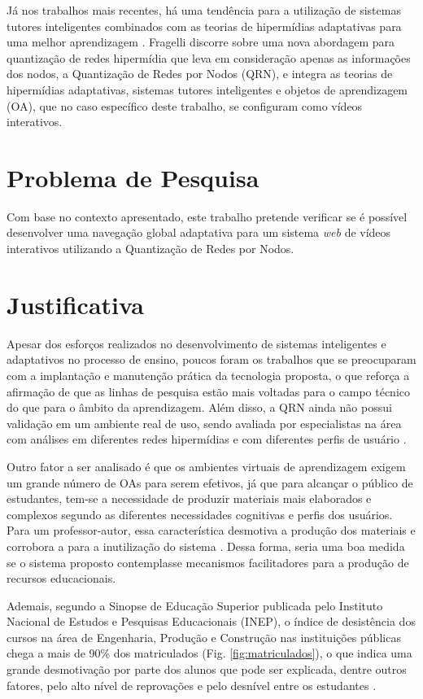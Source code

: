 Já nos trabalhos mais recentes, há uma tendência para a utilização de sistemas tutores inteligentes combinados com as teorias de hipermídias adaptativas para uma melhor aprendizagem \cite{fragelli2010}. Fragelli discorre sobre uma nova abordagem para quantização de redes hipermídia que leva em consideração apenas as informações dos nodos, a Quantização de Redes por Nodos (QRN), e integra as teorias de hipermídias adaptativas, sistemas tutores inteligentes e objetos de aprendizagem (OA), que no caso específico deste trabalho, se configuram como vídeos interativos.

\section*{Problema de Pesquisa}

Com base no contexto apresentado, este trabalho pretende verificar se é possível desenvolver uma navegação global adaptativa para um sistema \textit{web} de vídeos interativos utilizando a Quantização de Redes por Nodos.

\section*{Justificativa}

Apesar dos esforços realizados no desenvolvimento de sistemas inteligentes e adaptativos no processo de ensino, poucos foram os trabalhos que se preocuparam com a implantação e manutenção prática da tecnologia proposta, o que reforça a afirmação de que as linhas de pesquisa estão mais voltadas para o campo técnico do que para o âmbito da aprendizagem. Além disso, a QRN ainda não possui validação em um ambiente real de uso, sendo avaliada por especialistas na área com análises em diferentes redes hipermídias e com diferentes perfis de usuário \cite{fragelli2010}.

Outro fator a ser analisado é que os ambientes virtuais de aprendizagem exigem um grande número de OAs para serem efetivos, já que para alcançar o público de estudantes, tem-se a necessidade de produzir materiais mais elaborados e complexos segundo as diferentes necessidades cognitivas e perfis dos usuários. Para um professor-autor, essa característica desmotiva a produção dos materiais e corrobora a para a inutilização do sistema \cite{fragelli2010}. Dessa forma, seria uma boa medida se o sistema proposto contemplasse mecanismos facilitadores para a produção de recursos educacionais.

Ademais, segundo a Sinopse de Educação Superior publicada pelo Instituto Nacional de Estudos e Pesquisas Educacionais (INEP), o índice de desistência dos cursos na área de Engenharia, Produção e Construção nas instituições públicas chega a mais de 90\% dos matriculados (Fig. \ref{fig:matriculados}), o que indica uma grande desmotivação por parte dos alunos que pode ser explicada, dentre outros fatores, pelo alto nível de reprovações e pelo desnível entre os estudantes \cite{silva2005}.

